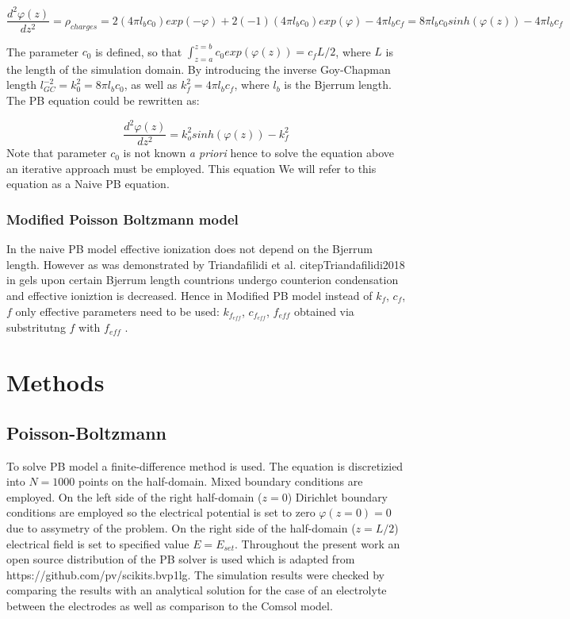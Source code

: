 \documentclass[twoside,twocolumn,9pt]{article}
\begin{document}
$$\frac{d^2 \varphi(z)}{dz^2} = \rho_{charges} = 2  (4 \pi l_b c_0) exp(-\varphi) + 2 (-1) (4 \pi l_b c_0) exp(\varphi) - 4 \pi l_b c_f = 8  \pi l_b c_0 sinh(\varphi(z)) -  4 \pi l_b c_f $$

The parameter $c_0$ is defined, so that $\int_{z=a}^{z=b} c_0 exp(\varphi (z)) = c_f L/2$, where $L$ is the length of the simulation domain. By introducing the inverse Goy-Chapman length $ l_{GC}^{-2} =  k_0^2 = 8 \pi l_b c_0$, as well as $k_f^2 = 4 \pi l_b c_f$, where  $l_b$ is the Bjerrum length.  The PB equation could be rewritten as:

$$\frac{d^2 \varphi(z)}{dz^2} = k_o^2 sinh(\varphi(z)) - k_f^2$$
Note that parameter $c_0$ is not known \textit{a priori} hence  to solve the equation above an iterative approach must be employed. This equation  We will refer to this equation as a Naive PB equation. 


\subsubsection{Modified Poisson Boltzmann model}

In the naive PB model effective ionization does not depend on the Bjerrum length. However as was demonstrated by Triandafilidi et al. citep{Triandafilidi2018} in gels upon certain Bjerrum length countrions undergo counterion condensation and effective ioniztion is decreased. Hence in Modified PB model instead of $k_f$, $c_f$, $f$ only effective parameters need to be used:   $k_{f_{eff}}$, $c_{f_{eff}}$, $f_{eff}$ obtained via substritutng $f$ with $f_{eff}$ .

\section{Methods}
\label{methods}

\subsection{Poisson-Boltzmann}

To solve PB model a finite-difference method is used. The equation is discretizied into $N=1000$ points on the half-domain. Mixed boundary conditions are employed. On the left side of the right half-domain ($z=0$) Dirichlet boundary conditions are employed so the electrical potential is  set to zero $\varphi(z=0) = 0$ due to assymetry of the problem. On the right side of the half-domain ($z=L/2$) electrical field is set to specified value $E = E_{set}$. Throughout the present work an open source distribution of the PB solver is used which is adapted from https://github.com/pv/scikits.bvp1lg. The simulation results were checked by comparing the results with an analytical solution for the case of an electrolyte between the electrodes as well as comparison to the Comsol model.
\end{document}
